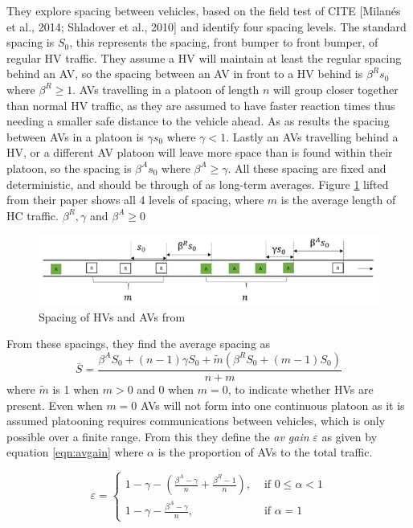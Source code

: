 \documentclass[12pt, a4paper, onecolumn]{article}
\begin{document}
They explore spacing between vehicles, based on the field test of CITE [Milanés et al., 2014; Shladover et al., 2010] and identify four spacing levels. The standard spacing is $S_0$, this represents the spacing, front bumper to front bumper, of regular HV traffic. They assume a HV will maintain at least the regular spacing behind an AV, so the spacing between an AV in front to a HV behind is $\beta^R s_0$ where $\beta^R \geq 1$. AVs travelling in a platoon of length $n$ will group closer together than normal HV traffic, as they are assumed to have faster reaction times thus needing a smaller safe distance to the vehicle ahead. As as results the spacing between AVs in a platoon is  $\gamma s_0$ where $\gamma < 1$. Lastly an AVs travelling behind a HV, or a different AV platoon will leave more space than is found within their platoon, so the spacing is $\beta^A s_0$ where $\beta^A \geq \gamma$. All these spacing are fixed and deterministic, and should be through of as long-term averages. Figure \ref{fig:avspacing} lifted from their paper shows all 4 levels of spacing, where $m$ is the average length of HC traffic. $\beta^R, \gamma $ and $\beta^A \geq 0$ 

\begin{figure}
	\centering
    \includegraphics[scale=1]{av-spacing.png}
	\caption{Spacing of HVs and AVs from \cite{chen2017}}
	\label{fig:avspacing}
	\end{figure}

From these spacings, they find the average spacing as
$$
\bar{S} = \frac{\beta^{A} S_{0} + (n-1) \gamma S_{0} + \tilde{m}\left(\beta^{R} S_{0} + (m-1) S_{0}\right)}{n+m}
$$
where $\tilde{m}$ is 1 when $m > 0$ and 0 when $m = 0$, to indicate whether HVs are present. Even when $m=0$ AVs will not form into one continuous platoon as it is assumed platooning requires communications between vehicles, which is only possible over a finite range. From this they define the \textit{av gain} $\varepsilon$ as given by equation \ref{eqn:avgain} where $\alpha$ is the proportion of AVs to the total traffic.

\begin{equation}
	\varepsilon = \left\{\begin{array}{ll}
		1 - \gamma - \left(\frac{\beta^{A}-\gamma}{n} + \frac{\beta^{R}-1}{n}\right), & \text { if } 0 \leq \alpha<1 \\
		1-\gamma-\frac{\beta^{A}-\gamma}{n}, & \text { if } \alpha=1
		\end{array}\right.
	\label{eqn:avgain}
	\end{equation}
\end{document}
